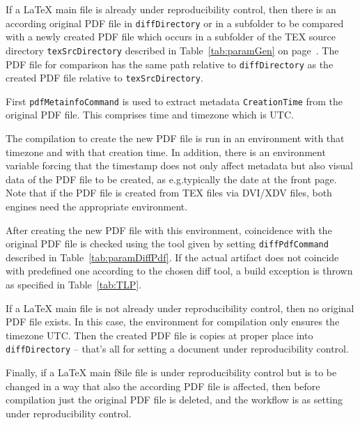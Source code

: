If a \LaTeX{} main file is already under reproducibility control, 
then there is an according original PDF file in \texttt{diffDirectory} or in a subfolder 
to be compared with a newly created PDF file 
which occurs in a subfolder of the TEX source directory \texttt{texSrcDirectory} 
described in Table~\ref{tab:paramGen} on page~\pageref{tab:paramGen}. 
The PDF file for comparison has the same path relative to \texttt{diffDirectory} 
as the created PDF file relative to \texttt{texSrcDirectory}. 

First \texttt{pdfMetainfoCommand} is used 
to extract metadata \texttt{CreationTime} from the original PDF file. 
This comprises time and timezone which is UTC\@. 

The compilation to create the new PDF file is run in an environment 
with that timezone and with that creation time. 
In addition, there is an environment variable forcing 
that the timestamp does not only affect metadata but also visual data of the PDF file 
to be created, 
as e.g.\@ typically the date at the front page. 
Note that if the PDF file is created from TEX files via DVI/XDV files, 
both engines need the appropriate environment. 

After creating the new PDF file with this environment, 
coincidence with the original PDF file is checked 
using the tool given by setting \texttt{diffPdfCommand} described in Table~\ref{tab:paramDiffPdf}. 
If the actual artifact does not coincide with predefined one 
according to the chosen diff tool, 
a build exception is thrown as specified in Table~\ref{tab:TLP}. 
\medskip


If a \LaTeX{} main file is not already under reproducibility control, 
then no original PDF file exists. 
In this case, the environment for compilation only ensures the timezone UTC\@. 
Then the created PDF file is copies at proper place into \texttt{diffDirectory} 
-- that's all for setting a document under reproducibility control. 

Finally, if a \LaTeX{} main f8ile file is under reproducibility control 
but is to be changed in a way that also the according PDF file is affected, 
then before compilation just the original PDF file is deleted, 
and the workflow is as setting under reproducibility control. 
\medskip


